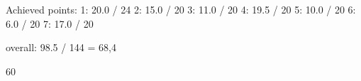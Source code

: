 Achieved points:
1: 20.0 / 24
2: 15.0 / 20
3: 11.0 / 20
4: 19.5 / 20
5: 10.0 / 20
6:  6.0 / 20
7: 17.0 / 20

overall: 98.5 / 144 = 68,4%


60%
